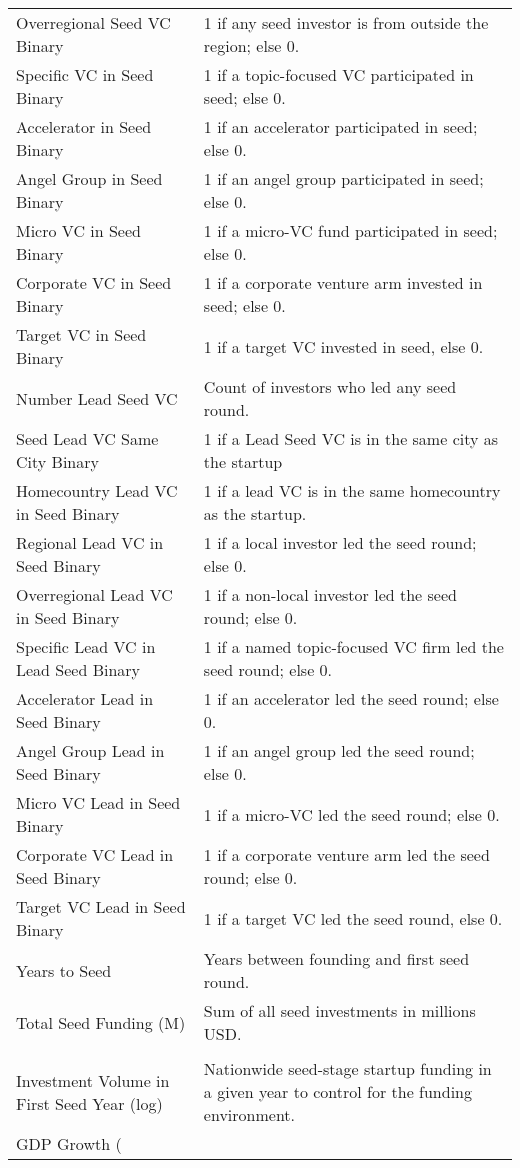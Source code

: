 {\begin{tabular}{p{} p{}}
Overregional Seed VC Binary & 1 if any seed investor is from outside the region; else 0. \\[0.4em]
Specific VC in Seed Binary & 1 if a topic-focused VC participated in seed; else 0. \\[0.4em]
Accelerator in Seed Binary & 1 if an accelerator participated in seed; else 0. \\[0.4em]
Angel Group in Seed Binary & 1 if an angel group participated in seed; else 0. \\[0.4em]
Micro VC in Seed Binary & 1 if a micro-VC fund participated in seed; else 0. \\[0.4em]
Corporate VC in Seed Binary & 1 if a corporate venture arm invested in seed; else 0. \\[0.4em]
Target VC in Seed Binary & 1 if a target VC invested in seed, else 0. \\[0.4em]
Number Lead Seed VC & Count of investors who led any seed round. \\[0.4em]
Seed Lead VC Same City Binary & 1 if a Lead Seed VC is in the same city as the startup \\[0.4em]
Homecountry Lead VC in Seed Binary & 1 if a lead VC is in the same homecountry as the startup. \\[0.4em]
Regional Lead VC in Seed Binary & 1 if a local investor led the seed round; else 0. \\[0.4em]
Overregional Lead VC in Seed Binary & 1 if a non-local investor led the seed round; else 0. \\[0.4em]
Specific Lead VC in Lead Seed Binary & 1 if a named topic-focused VC firm led the seed round; else 0. \\[0.4em]
Accelerator Lead in Seed Binary & 1 if an accelerator led the seed round; else 0. \\[0.4em]
Angel Group Lead in Seed Binary & 1 if an angel group led the seed round; else 0. \\[0.4em]
Micro VC Lead in Seed Binary & 1 if a micro-VC led the seed round; else 0. \\[0.4em]
Corporate VC Lead in Seed Binary & 1 if a corporate venture arm led the seed round; else 0. \\[0.4em]
Target VC Lead in Seed Binary & 1 if a target VC led the seed round, else 0. \\[0.4em]
Years to Seed & Years between founding and first seed round. \\[0.4em]
Total Seed Funding (M) & Sum of all seed investments in millions USD. \\[0.4em]
\addlinespace[0.5em]
\midrule
\multicolumn{2}{c}{\tiny\textsc{CONTROL VARIABLES}} \\
\midrule
Investment Volume in First Seed Year (log) & Nationwide seed-stage startup funding in a given year to control for the funding environment. \\[0.4em]
GDP Growth (%
\bottomrule
\end{tabular}
}
